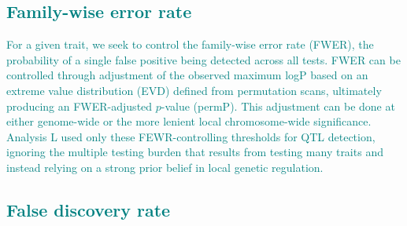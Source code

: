 \documentclass[9pt,twocolumn,twoside]{gsajnl}
\newcommand{\GKinline}[1]{\textcolor{teal}{#1}}
\begin{document}
\subsection{\GKinline{Family-wise error rate}}

\GKinline{For a given trait, we seek to control the family-wise error rate (FWER), the probability of a single false positive being detected across all tests. FWER can be controlled through adjustment of the observed maximum logP based on an extreme value distribution (EVD) defined from permutation scans, ultimately producing an FWER-adjusted $p$-value (permP). This adjustment can be done at either genome-wide or the more lenient local chromosome-wide significance. Analysis L used only these FEWR-controlling thresholds for QTL detection, ignoring the multiple testing burden that results from testing many traits and instead relying on a strong prior belief in local genetic regulation.}

\subsection{\GKinline{False discovery rate}}



\end{document}
